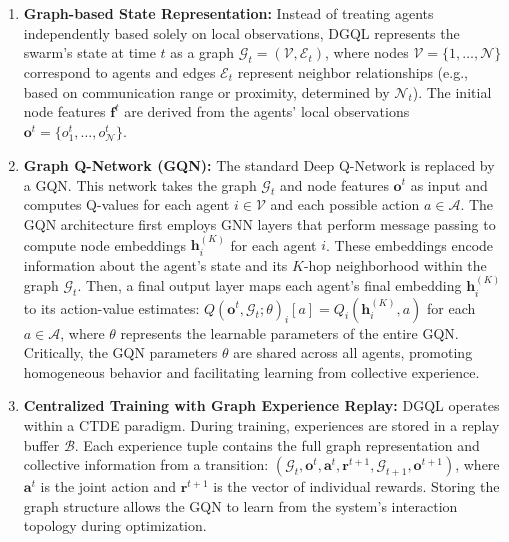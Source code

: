 \begin{enumerate}%
    \item \textbf{Graph-based State Representation:} 
    Instead of treating agents independently based solely on local observations, 
    DGQL represents the swarm's state at time \(t\) 
    as a graph \linebreak  
    \(\mathcal{G}_t = (\mathcal{V}, \mathcal{E}_t)\), 
    where nodes 
    \(\mathcal{V} = \{1, \dots, \mathcal{N}\}\) 
    correspond to agents and edges 
    \(\mathcal{E}_t\) 
    represent neighbor relationships 
    (e.g., based on communication range or proximity, determined by \(\mathcal{N}_t\)). 
    The initial node features \(\mathbf{f}^t\) 
    are derived from the agents' local observations \(\mathbf{o}^t = \{o_1^t, \dots, o_{\mathcal{N}}^t\}\).

    \item \textbf{Graph Q-Network (GQN):} 
    The standard Deep Q-Network is replaced by a GQN. 
    This network takes the graph \(\mathcal{G}_t\) 
    and node features \(\mathbf{o}^t\) 
    as input and computes Q-values for each agent \(i \in \mathcal{V}\) 
    and each possible action \(a \in \mathcal{A}\). 
    The GQN architecture first employs GNN layers 
    that perform message passing to compute node embeddings 
    \(\mathbf{h}_i^{(K)}\) for each agent \(i\). 
    These embeddings encode information about the agent's state 
    and its \(K\)-hop neighborhood within the graph \(\mathcal{G}_t\). 
    Then, a final output layer maps each agent's final embedding 
    \(\mathbf{h}_i^{(K)}\) to its action-value estimates: 
    \(Q(\mathbf{o}^t, \mathcal{G}_t; \theta)_i[a] = Q_i(\mathbf{h}_i^{(K)}, a)\) for each \(a \in \mathcal{A}\), 
    where \(\theta\) represents the learnable parameters of the entire GQN.    
    Critically, the GQN parameters \(\theta\) are shared across all agents,
    promoting homogeneous behavior and facilitating learning from collective experience.

    \item \textbf{Centralized Training with Graph Experience Replay:}  
    DGQL operates within a CTDE paradigm. 
    During training, 
    experiences are stored in a replay buffer \(\mathcal{B}\). 
    Each experience tuple contains the full graph representation 
    and collective information from a transition: 
    \((\mathcal{G}_t, \mathbf{o}^t, \mathbf{a}^t, \mathbf{r}^{t+1}, \mathcal{G}_{t+1}, \mathbf{o}^{t+1})\), 
    where \(\mathbf{a}^t\) is the joint action and \(\mathbf{r}^{t+1}\) 
    is the vector of individual rewards. 
    Storing the graph structure allows the GQN to learn from the system's interaction topology 
    during optimization.
\end{enumerate}

